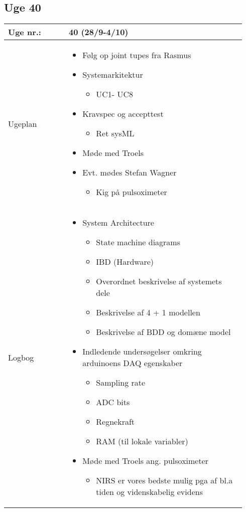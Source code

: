 	\subsection{Uge 40}
	\begin{longtable}{|p{0.24\linewidth}|p{0.7\linewidth}|}
		\hline
		Uge nr.: & 40 (28/9-4/10)\\ \hline
		Ugeplan & 
		\begin{itemize}
			\item Følg op joint tupes fra Rasmus
			\item Systemarkitektur 
			\begin{itemize}
				\item UC1- UC8
			\end{itemize}
			\item Kravspec og accepttest
			\begin{itemize}
				\item Ret sysML
			\end{itemize}
			\item Møde med Troels
			\item Evt. mødes Stefan Wagner
			\begin{itemize}
				\item Kig på pulsoximeter
			\end{itemize}
		\end{itemize}
		
		\\ \hline
		Logbog & 
		\begin{itemize}
			\item System Architecture
			\begin{itemize}
				\item State machine diagrams
				\item IBD (Hardware)
				\item Overordnet beskrivelse af systemets dele
				\item Beskrivelse af 4 + 1 modellen
				\item Beskrivelse af BDD og domæne model
			\end{itemize}
			\item Indledende undersøgelser omkring arduinoens DAQ egenskaber
			\begin{itemize}
				\item Sampling rate
				\item ADC bits
				\item Regnekraft
				\item RAM (til lokale variabler)
			\end{itemize}
			\item Møde med Troels ang. pulsoximeter
			\begin{itemize}
				\item NIRS er vores bedste mulig pga af bl.a tiden og videnskabelig evidens
			\end{itemize}
		\end{itemize}
		\\ \hline
	\end{longtable}
	
